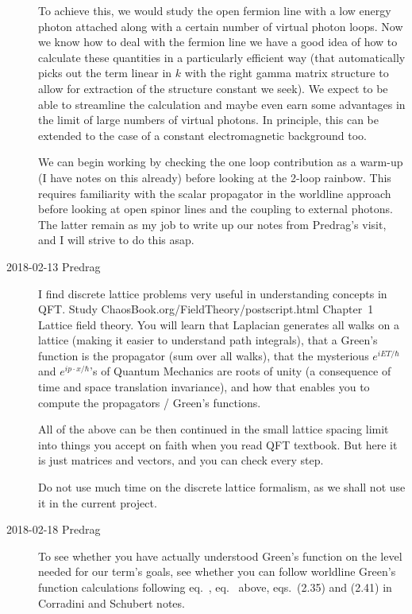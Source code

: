 \begin{description}
To achieve this, we would study the open fermion line with a low energy
photon attached along with a certain number of virtual photon loops.
Now we know how to deal with the fermion line we have a good idea
of how to calculate these quantities in a particularly efficient way
(that automatically picks out the term linear in $k$ with the right gamma
matrix structure to allow for extraction of the structure constant we
seek). We expect to be able to streamline the calculation  and maybe even
earn some advantages in the limit of large numbers of virtual photons. In
principle, this can be extended to the case of a constant electromagnetic
background too.

We can begin working by checking the one loop contribution as a warm-up
(I have notes on this already) before looking at the 2-loop rainbow. This
requires familiarity with the scalar propagator in the worldline approach
before looking at open spinor lines and the coupling to external photons.
The latter remain as my job to write up our notes from Predrag's visit,
and I will strive to do this asap.

\item[2018-02-13 Predrag]
    I find discrete lattice problems very useful in understanding
    concepts in QFT. Study
    {ChaosBook.org/FieldTheory/postscript.html} Chapter~1 {Lattice field
    theory}. You will learn that Laplacian generates all walks on a
    lattice (making it easier to understand path integrals), that a
    Green's function is the propagator (sum over all walks), that the
    mysterious $e^{iET/\hbar}$ and $e^{ip\cdot{x}/\hbar}$'s of Quantum
    Mechanics are roots of unity (a consequence of time and space
    translation invariance), and how that enables you to compute the
    propagators / Green's functions.

    All of the above can be then continued in the small lattice spacing
    limit into things you accept on faith when you read QFT textbook.
    But here it is just matrices and vectors, and you can check every
    step.

    Do not use much time on the discrete lattice formalism, as we shall
    not use it in the current project.

\item[2018-02-18 Predrag] To see whether you have actually understood
Green's function on the level needed for our term's goals, see whether
you can follow worldline Green's function calculations following
eq.~, eq.~ above, eqs.~(2.35)
and (2.41) in Corradini and Schubert notes.


\end{description}
